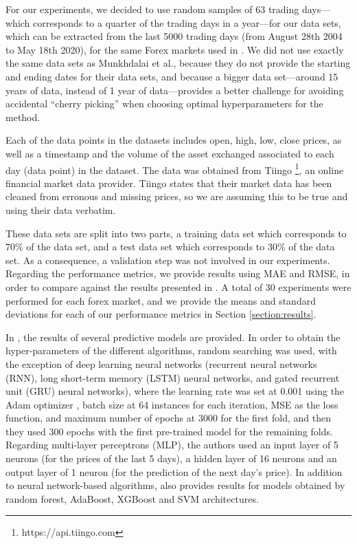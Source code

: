\documentclass{ieeeaccess}
\begin{document}
For our experiments, we decided to use random samples of 63 trading
days---which corresponds to a quarter of the trading days in a
year---for our data sets, which can be extracted from the last 5000
trading days (from August 28th 2004 to May 18th 2020), for the same
Forex markets used in \cite{Munkhdalai2019}. We did not use exactly
the same data sets as Munkhdalai et al., because they do not provide
the starting and ending dates for their data sets, and because a
bigger data set---around 15 years of data, instead of 1 year of
data---provides a better challenge for avoiding accidental ``cherry
picking'' \cite{morse2010cherry} when choosing optimal hyperparameters
for the method. %

Each of the data points in the datasets includes open, high, low, close
prices, as well as a timestamp and the volume of the asset exchanged
associated to each day (data point) in the dataset. The data was
obtained from Tiingo \footnote{https://api.tiingo.com}, an online financial market data provider. Tiingo
states that their market data has been cleaned from erronous and
missing prices, so we are assuming this to be true and using their
data verbatim.

These data sets
are split into two parts, a training data set which corresponds to
70\% of the data set, and a test data set which corresponds to 30\% of
the data set. As a consequence, a validation step was not involved in
our experiments. Regarding the performance metrics, we provide results
using MAE and RMSE, in order to compare against the results presented
in \cite{Munkhdalai2019}. A total
of 30 experiments were performed for each forex market, and we provide
the means and standard deviations for each of our performance metrics
in Section \ref{section:results}.

In \cite{Munkhdalai2019}, the results of several predictive models are
provided. In order to obtain the hyper-parameters of the different
algorithms, random searching was used, with the exception of deep
learning neural networks (recurrent neural networks (RNN), long
short-term memory (LSTM) neural networks, and gated recurrent unit
(GRU) neural networks), where the learning rate was set at 0.001 using
the Adam optimizer \cite{kingma2014adam}, batch size at 64 instances
for each iteration, MSE as the loss function, and maximum number of
epochs at 3000 for the first fold, and then they used 300 epochs with
the first pre-trained model for the remaining folds. Regarding
multi-layer perceptrons (MLP), the authors used an input layer of 5 neurons
(for the prices of the last 5 days), a hidden layer of 16 neurons and
an output layer of 1 neuron (for the prediction of the next day's
price). In addition to neural network-based algorithms,
\cite{kingma2014adam} also provides results for models obtained by
random forest, AdaBoost, XGBoost and SVM
architectures.
\end{document}
